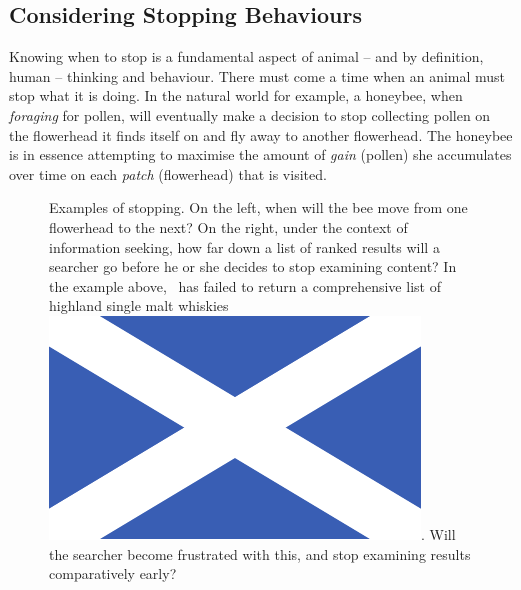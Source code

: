 \subsection{Considering Stopping Behaviours}
Knowing when to stop is a fundamental aspect of animal -- and by definition, human -- thinking and behaviour. There must come a time when an animal must stop what it is doing. In the natural world for example, a honeybee, when \emph{foraging} for pollen, will eventually make a decision to stop collecting pollen on the flowerhead it finds itself on and fly away to another flowerhead. The honeybee is in essence attempting to maximise the amount of \emph{gain} (pollen) she accumulates over time on each \emph{patch} (flowerhead) that is visited.

\begin{figure}[t!]
    \centering
    \caption[Basic stopping examples]{Examples of stopping. On the left, when will the bee move from one flowerhead to the next? On the right, under the context of information seeking, how far down a list of ranked results will a searcher go before he or she decides to stop examining content? In the example above, \searchlogo~has failed to return a comprehensive list of highland single malt whiskies~\includegraphics[height=\fontcharht\font`\d]{figures/ch0-saltire.pdf}. Will the searcher become frustrated with this, and stop examining results comparatively early?}
    \label{fig:ch1-stopping}
\end{figure}

